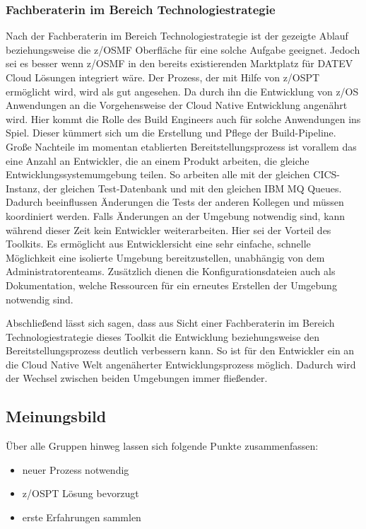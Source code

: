 \subsubsection{Fachberaterin im Bereich Technologiestrategie}
Nach der Fachberaterin im Bereich Technologiestrategie ist der gezeigte Ablauf beziehungsweise die z/OSMF Oberfläche für eine solche Aufgabe geeignet.
Jedoch sei es besser wenn z/OSMF in den bereits existierenden \glqq Marktplatz\grqq{} für DATEV Cloud Lösungen integriert wäre.
Der Prozess, der mit Hilfe von z/OSPT ermöglicht wird, wird als gut angesehen.
Da durch ihn die Entwicklung von z/OS Anwendungen an die Vorgehensweise der Cloud Native Entwicklung angenährt wird.
Hier kommt die Rolle des Build Engineers auch für solche Anwendungen ins Spiel.
Dieser kümmert sich um die Erstellung und Pflege der Build-Pipeline.
Große Nachteile im momentan etablierten Bereitstellungsprozess ist vorallem das eine Anzahl an Entwickler, die an einem Produkt arbeiten, die gleiche Entwicklungssystemumgebung teilen.
So arbeiten alle mit der gleichen CICS-Instanz, der gleichen Test-Datenbank und mit den gleichen IBM MQ Queues.
Dadurch beeinflussen Änderungen die Tests der anderen Kollegen und müssen koordiniert werden.
Falls Änderungen an der Umgebung notwendig sind, kann während dieser Zeit kein Entwickler weiterarbeiten.
Hier sei der Vorteil des Toolkits.
Es ermöglicht aus Entwicklersicht eine sehr einfache, schnelle Möglichkeit eine isolierte Umgebung bereitzustellen, unabhängig von dem Administratorenteams.
Zusätzlich dienen die Konfigurationsdateien auch als Dokumentation, welche Ressourcen für ein erneutes Erstellen der Umgebung notwendig sind.

Abschließend lässt sich sagen, dass aus Sicht einer Fachberaterin im Bereich Technologiestrategie dieses Toolkit die Entwicklung beziehungsweise den Bereitstellungsprozess deutlich verbessern kann.
So ist für den Entwickler ein an die Cloud Native Welt angenäherter Entwicklungsprozess möglich.
Dadurch wird der Wechsel zwischen beiden Umgebungen immer fließender.

\subsection{Meinungsbild}
Über alle Gruppen hinweg lassen sich folgende Punkte zusammenfassen:

\begin{samepage}
\begin{itemize}
\item neuer Prozess notwendig
\item z/OSPT Lösung bevorzugt
\item erste Erfahrungen sammlen
\end{itemize}
\end{samepage}

